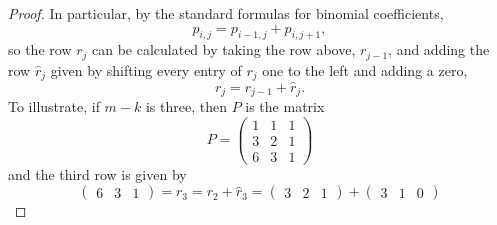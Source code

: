 \begin{proof}
  In particular, by the standard formulas for binomial coefficients,
  \[ p_{i,j} = p_{i-1,j} + p_{i,j+1}, \]
  so the row $r_{j}$ can be calculated by taking the row
  above,
  $r_{j-1}$, and adding the row $\widehat{r}_j$ given by shifting
  every entry of $r_j$ one to the left and adding a zero,
  \begin{equation}
    \label{eq:rows}
    r_j = r_{j-1} + \widehat{r}_j.
  \end{equation}
  To illustrate, if $m-k$ is three, then $P$ is the matrix
  \[ P = 
  \begin{pmatrix}
    1 &1 & 1 \\
    3 &2 & 1 \\
    6 & 3 & 1
  \end{pmatrix} \]
  and the third row is given by
  \[
  \begin{pmatrix}
    6 &3 & 1
  \end{pmatrix} = r_3 = r_2 + \widehat{r}_3 =
  \begin{pmatrix}
    3 & 2 & 1
  \end{pmatrix} +
  \begin{pmatrix}
    3 & 1 & 0
  \end{pmatrix} \]
  

\end{proof}
